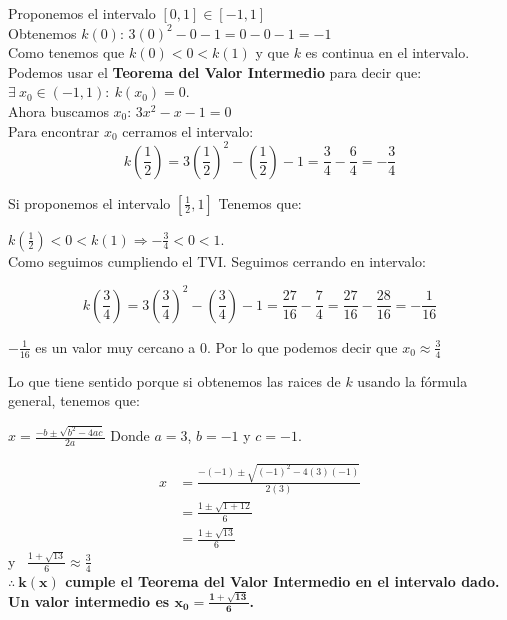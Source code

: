 \documentclass[12pt]{article}
\begin{document}
\begin{enumerate}[\hspace{9px} a)]
        Proponemos el intervalo $[0,1] \in [-1,1]$\\

        Obtenemos $k(0)$: \quad \(3(0)^2-0-1=0-0-1=-1\)\\

        Como tenemos que \(k(0) < 0 < k(1)\) y que $k$ es continua en el intervalo. Podemos usar el \textbf{Teorema del Valor Intermedio} para decir que: \(\exists \ x_0 \in (-1,1) : \ k(x_0)=0\).\\

        Ahora buscamos $x_0$: \quad $3x^2-x-1=0$\\

        Para encontrar $x_0$ cerramos el intervalo:
        \[k\left(\displaystyle\frac{1}{2}\right) = 3\left(\frac{1}{2}\right)^2-\left(\frac{1}{2}\right)-1=\frac{3}{4}-\frac{6}{4}=-\frac{3}{4}\]

        Si proponemos el intervalo $\left[\displaystyle\frac{1}{2},1\right]$ Tenemos que:

        \(k\left(\displaystyle\frac{1}{2}\right) < 0 < k(1) \Longrightarrow -\displaystyle\frac{3}{4} <0<1\).\\

        Como seguimos cumpliendo el TVI. Seguimos cerrando en intervalo:

        \[k\left(\displaystyle\frac{3}{4}\right)=3\left(\frac{3}{4}\right)^2-\left(\frac{3}{4}\right)-1=\frac{27}{16}-\frac{7}{4}=\frac{27}{16}-\frac{28}{16}=-\frac{1}{16}\]

        $-\displaystyle\frac{1}{16}$ es un valor muy cercano a 0. Por lo que podemos decir que $x_0 \approx \displaystyle\frac{3}{4}$

        Lo que tiene sentido porque si obtenemos las raices de $k$ usando la f\'ormula general, tenemos que:

        \(x=\displaystyle\frac{-b\pm \sqrt{b^2-4ac}}{2a}\) \quad Donde $a=3$, $b=-1$ y $c=-1$.

        \begin{align*}
            x&=\frac{-(-1)\pm \sqrt{(-1)^2-4(3)(-1)}}{2(3)}\\
            &=\frac{1\pm \sqrt{1+12}}{6}\\
            &=\frac{1\pm \sqrt{13}}{6}
        \end{align*}
        y \ \(\displaystyle\frac{1+\sqrt{13}}{6} \approx \frac{3}{4}\)\\

        \textbf{$\mathbf{\therefore \ k(x)}$ cumple el Teorema del Valor Intermedio en el intervalo dado. Un valor intermedio es $\mathbf{x_0=\displaystyle\frac{1+\sqrt{13}}{6}}$.}\\

\end{enumerate}
\end{document}
